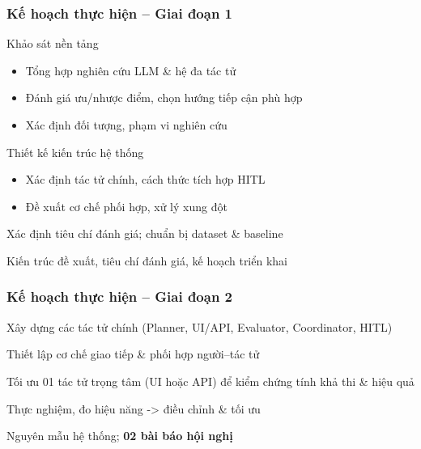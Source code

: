 \begin{frame}
    \frametitle{Kế hoạch thực hiện – Giai đoạn 1}
    \begin{BulletTight}
        \item Khảo sát nền tảng
        \begin{itemize}
            \item Tổng hợp nghiên cứu LLM \& hệ đa tác tử
            \item Đánh giá ưu/nhược điểm, chọn hướng tiếp cận phù hợp
            \item Xác định đối tượng, phạm vi nghiên cứu
        \end{itemize}
        \item Thiết kế kiến trúc hệ thống
        \begin{itemize}
            \item Xác định tác tử chính, cách thức tích hợp HITL
            \item Đề xuất cơ chế phối hợp, xử lý xung đột

        \end{itemize}
        \item Xác định tiêu chí đánh giá; chuẩn bị dataset \& baseline
        \item[\raise0.2ex\hbox{\color{KHTN_BLUE!85}\scriptsize\faArrowRight}]
        Kiến trúc đề xuất, tiêu chí đánh giá, kế hoạch triển khai
    \end{BulletTight}
\end{frame}

\begin{frame}
    \frametitle{Kế hoạch thực hiện – Giai đoạn 2}

    \begin{BulletTight}
        \item Xây dựng các tác tử chính (Planner, UI/API, Evaluator, Coordinator, HITL)
        \item Thiết lập cơ chế giao tiếp \& phối hợp người–tác tử
        \item Tối ưu 01 tác tử trọng tâm (UI hoặc API) để kiểm chứng tính khả thi \& hiệu quả
        \item Thực nghiệm, đo hiệu năng -> điều chỉnh & tối ưu
        \item[\raise0.2ex\hbox{\color{KHTN_BLUE!85}\scriptsize\faArrowRight}]
        Nguyên mẫu hệ thống; \textbf{02 bài báo hội nghị}
    \end{BulletTight}

\end{frame}

